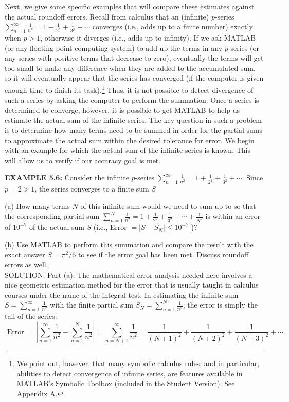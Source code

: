 \documentclass[../main.tex]{subfiles}
\begin{document}
Next, we give some specific examples that will compare these estimates against the actual roundoff errors. Recall from calculus that an (infinite) $p$-series $\sum_{n=1}^{\infty} \frac{1}{n^{p}}=1+\frac{1}{2^{p}}+\frac{1}{3^{p}}+\cdots$ converges (i.e., adds up to a finite number) exactly when $p>1$, otherwise it diverges (i.e., adds up to infinity). If we ask MATLAB (or any floating point computing system) to add up the terms in any $p$-series (or any series with positive terms that decrease to zero), eventually the terms will get too small to make any difference when they are added to the accumulated sum, so it will eventually appear that the series has converged (if the computer is given enough time to finish its task).\footnote{We point out, however, that many symbolic calculus rules, and in particular, abilities to detect convergence of infinite series, are features available in MATLAB's Symbolic Toolbox (included in the Student Version). See Appendix A.} Thus, it is not possible to detect divergence of such a series by asking the computer to perform the summation. Once a series is determined to converge, however, it is possible to get MATLAB to help us estimate the actual sum of the infinite series. The key question in such a problem is to determine how many terms need to be summed in order for the partial sums to approximate the actual sum within the desired tolerance for error. We begin with an example for which the actual sum of the infinite series is known. This will allow us to verify if our accuracy goal is met.

\textbf{EXAMPLE 5.6:} Consider the infinite $p$-series $\sum_{n=1}^{\infty} \frac{1}{n^{2}}=1+\frac{1}{2^{2}}+\frac{1}{3^{2}}+\cdots$. Since $p=2>1$, the series converges to a finite sum $S$

(a) How many terms $N$ of this infinite sum would we need to sum up to so that the corresponding partial sum $\sum_{n=1}^{N} \frac{1}{n^{2}}=1+\frac{1}{2^{2}}+\frac{1}{3^{2}}+\cdots+\frac{1}{N^{2}}$ is within an error of $10^{-7}$ of the actual sum $S$ (i.e., Error $=\left|S-S_{N}\right| \leq 10^{-7}$ )?

(b) Use MATLAB to perform this summation and compare the result with the exact answer $S=\pi^{2} / 6$ to see if the error goal has been met. Discuss roundoff errors as well.\\

SOLUTION: Part (a): The mathematical error analysis needed here involves a nice geometric estimation method for the error that is usually taught in calculus courses under the name of the integral test. In estimating the infinite sum $S=\sum_{n=1}^{\infty} \frac{1}{n^{2}}$ with the finite partial sum $S_{N}=\sum_{n=1}^{N} \frac{1}{n^{2}}$, the error is simply the tail of the series:
$$
\text { Error }=\left|\sum_{n=1}^{\infty} \frac{1}{n^{2}}-\sum_{n=1}^{N} \frac{1}{n^{2}}\right|=\sum_{n=N+1}^{\infty} \frac{1}{n^{2}}=\frac{1}{(N+1)^{2}}+\frac{1}{(N+2)^{2}}+\frac{1}{(N+3)^{2}}+\cdots \text {. }
$$
\end{document}
